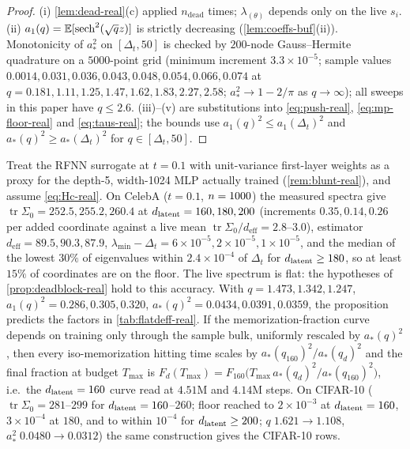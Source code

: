 \begin{proof}
(i) \cref{lem:dead-real}(c) applied $n_{\mathrm{dead}}$ times; $\lambda_{(\theta)}$ depends only on the live $s_i$. (ii) $a_1(q)=\mathbb{E}[\operatorname{sech}^2(\sqrt qz)]$ is strictly decreasing (\cref{lem:coeffs-buf}(ii)). Monotonicity of $a_\ast^2$ on $[\Delta_t,50]$ is checked by $200$-node Gauss--Hermite quadrature on a $5000$-point grid (minimum increment $3.3\times10^{-5}$; sample values $0.0014,0.031,0.036,0.043,0.048,0.054,0.066,0.074$ at $q=0.181,1.11,1.25,1.47,1.62,1.83,2.27,2.58$; $a_\ast^2\to1-2/\pi$ as $q\to\infty$); all sweeps in this paper have $q\le2.6$. (iii)--(v) are substitutions into \eqref{eq:push-real}, \eqref{eq:mp-floor-real} and \eqref{eq:taus-real}; the bounds use $a_1(q)^2\le a_1(\Delta_t)^2$ and $a_\ast(q)^2\ge a_\ast(\Delta_t)^2$ for $q\in[\Delta_t,50]$.
\end{proof}

\begin{corollary}\label{cor:flatdeff-real}
Treat the RFNN surrogate at $t=0.1$ with unit-variance first-layer weights as a proxy for the depth-5, width-1024 MLP actually trained (\cref{rem:blunt-real}), and assume \eqref{eq:Hc-real}. On CelebA ($t=0.1$, $n=1000$) the measured spectra give $\operatorname{tr}\Sigma_0=252.5,255.2,260.4$ at $d_{\mathrm{latent}}=160,180,200$ (increments $0.35,0.14,0.26$ per added coordinate against a live mean $\operatorname{tr}\Sigma_0/d_{\mathrm{eff}}=2.8$--$3.0$), estimator $d_{\mathrm{eff}}=89.5,90.3,87.9$, $\lambda_{\min}-\Delta_t=6\times10^{-5},2\times10^{-5},1\times10^{-5}$, and the median of the lowest $30\%$ of eigenvalues within $2.4\times10^{-4}$ of $\Delta_t$ for $d_{\mathrm{latent}}\ge180$, so at least $15\%$ of coordinates are on the floor. The live spectrum is flat: the hypotheses of \cref{prop:deadblock-real} hold to this accuracy. With $q=1.473,1.342,1.247$, $a_1(q)^2=0.286,0.305,0.320$, $a_\ast(q)^2=0.0434,0.0391,0.0359$, the proposition predicts the factors in \cref{tab:flatdeff-real}. If the memorization-fraction curve depends on training only through the sample bulk, uniformly rescaled by $a_\ast(q)^2$, then every iso-memorization hitting time scales by $a_\ast(q_{160})^2/a_\ast(q_d)^2$ and the final fraction at budget $T_{\max}$ is $F_d(T_{\max})=F_{160}\big(T_{\max}\,a_\ast(q_d)^2/a_\ast(q_{160})^2\big)$, i.e.\ the $d_{\mathrm{latent}}=160$ curve read at $4.51$M and $4.14$M steps. On CIFAR-10 ($\operatorname{tr}\Sigma_0=281$--$299$ for $d_{\mathrm{latent}}=160$--$260$; floor reached to $2\times10^{-3}$ at $d_{\mathrm{latent}}=160$, $3\times10^{-4}$ at $180$, and to within $10^{-4}$ for $d_{\mathrm{latent}}\ge200$; $q\;1.621\to1.108$, $a_\ast^2\;0.0480\to0.0312$) the same construction gives the CIFAR-10 rows.
\end{corollary}

